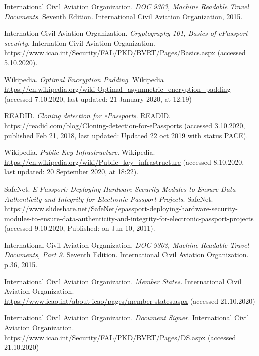 
\begin{thebibliography}{9}
International Civil Aviation Organization.
\textit{DOC 9303, Machine Readable Travel Documents.} Seventh Edition. International Civil Aviation Organization, 2015.

Internation Civil Aviation Organization. 
\textit{Cryptography 101, Basics of ePassport secuirty}.
Internation Civil Aviation Organization. \\
\url{https://www.icao.int/Security/FAL/PKD/BVRT/Pages/Basics.aspx} (accessed 5.10.2020).

Wikipedia.
\textit{Optimal Encryption Padding}. Wikipedia\\
\url{https://en.wikipedia.org/wiki Optimal_asymmetric_encryption_padding} (accessed 7.10.2020, last updated: 21 January 2020, at 12:19)

READID.  
\textit{Cloning detection for ePassports}.
READID. \\
\url{https://readid.com/blog/Cloning-detection-for-ePassports} (accessed 3.10.2020, published Feb 21, 2018, last updated: Updated 22 oct 2019 with status PACE).

Wikipedia.  
\textit{Public Key Infrastructure}.
Wikipedia. \\
\url{https://en.wikipedia.org/wiki/Public_key_infrastructure} (accessed 8.10.2020,  last updated: 20 September 2020, at 18:22).

SafeNet.  
\textit{E-Passport: Deploying Hardware Security Modules to Ensure Data Authenticity and Integrity for Electronic Passport Projects}.
SafeNet. \\
\url{https://www.slideshare.net/SafeNet/epassport-deploying-hardware-security-modules-to-ensure-data-authenticity-and-integrity-for-electronic-passport-projects} (accessed 9.10.2020,  Published: on Jun 10, 2011).

International Civil Aviation Organization.
\textit{DOC 9303, Machine Readable Travel Documents, Part 9.} Seventh Edition. International Civil Aviation Organization. p.36, 2015.

International Civil Aviation Organization.
\textit{Member States.} International Civil Aviation Organization.\\
\url{https://www.icao.int/about-icao/pages/member-states.aspx} (accessed 21.10.2020)

International Civil Aviation Organization.
\textit{Document Signer.} International Civil Aviation Organization.\\
\url{https://www.icao.int/Security/FAL/PKD/BVRT/Pages/DS.aspx} (accessed 21.10.2020)

\end{thebibliography}